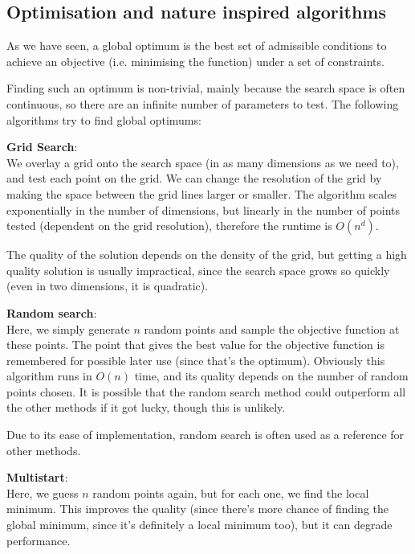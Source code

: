 
\subsection{Optimisation and nature inspired algorithms}

As we have seen, a global optimum is the best set of admissible conditions to
achieve an objective (i.e. minimising the function) under a set of constraints.

Finding such an optimum is non-trivial, mainly because the search space is often
continuous, so there are an infinite number of parameters to test. The following
algorithms try to find global optimums:

\begin{description}
  \item \textbf{Grid Search}:\\
  We overlay a grid onto the search space (in as many dimensions as we need to),
  and test each point on the grid. We can change the resolution of the grid by
  making the space between the grid lines larger or smaller. The algorithm
  scales exponentially in the number of dimensions, but linearly in the number
  of points tested (dependent on the grid resolution), therefore the runtime is
  $O(n^d)$.

  The quality of the solution depends on the density of the grid, but getting a
  high quality solution is usually impractical, since the search space grows so
  quickly (even in two dimensions, it is quadratic).

  \item \textbf{Random search}:\\
  Here, we simply generate $n$ random points and sample the objective function
  at these points. The point that gives the best value for the objective
  function is remembered for possible later use (since that's the optimum).
  Obviously this algorithm runs in $O(n)$ time, and its quality depends on the
  number of random points chosen. It is possible that the random search method
  could outperform all the other methods if it got lucky, though this is
  unlikely.

  Due to its ease of implementation, random search is often used as a reference
  for other methods.

  \item \textbf{Multistart}:\\

  Here, we guess $n$ random points again, but for each one, we find the local
  minimum. This improves the quality (since there's more chance of finding the
  global minimum, since it's definitely a local minimum too), but it can degrade
  performance.


\end{description}
